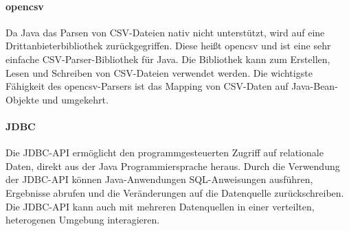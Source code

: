 \paragraph{opencsv}

Da Java das Parsen von CSV-Dateien nativ nicht unterstützt, wird auf eine Drittanbieterbibliothek zurückgegriffen. Diese heißt opencsv und ist eine sehr einfache CSV-Parser-Bibliothek für Java. Die Bibliothek kann zum Erstellen, Lesen und Schreiben von CSV-Dateien verwendet werden. Die wichtigste Fähigkeit des opencsv-Parsers ist das Mapping von CSV-Daten auf Java-Bean-Objekte und umgekehrt.

\paragraph{JDBC}

Die JDBC-API ermöglicht den programmgesteuerten Zugriff auf relationale Daten, direkt aus der Java Programmiersprache heraus. Durch die Verwendung der JDBC-API können Java-Anwendungen SQL-Anweisungen ausführen, Ergebnisse abrufen und die Veränderungen auf die Datenquelle zurückschreiben. Die JDBC-API kann auch mit mehreren Datenquellen in einer verteilten, heterogenen Umgebung interagieren. 
